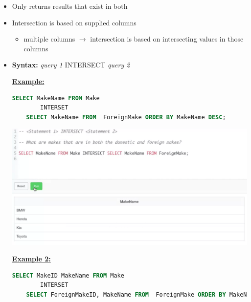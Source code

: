 \documentclass[12pt]{article}
\begin{document}
\begin{itemize}
    \item Only returns results that exist in both
    \item Intersection is based on supplied columns
    \begin{itemize}
        \item multiple columns $\to$ intersection is based on intersecting values in those columns
    \end{itemize}
    \item \textbf{Syntax:} \textit{query 1} INTERSECT \textit{query 2}

    \bigskip

    \underline{\textbf{Example:}}

    \bigskip

    \begin{lstlisting}[language=SQL]
    SELECT MakeName FROM Make
        INTERSET
    SELECT MakeName FROM  ForeignMake ORDER BY MakeName DESC;
    \end{lstlisting}

    \bigskip

    \begin{center}
    \includegraphics[width=\linewidth]{images/part_5_notes_4.png}
    \end{center}

    \bigskip

    \underline{\textbf{Example 2:}}

    \bigskip

    \begin{lstlisting}[language=SQL]
    SELECT MakeID MakeName FROM Make
        INTERSET
    SELECT ForeignMakeID, MakeName FROM  ForeignMake ORDER BY MakeName DESC; // <- Returns empty result
    \end{lstlisting}


\end{itemize}
\end{document}
